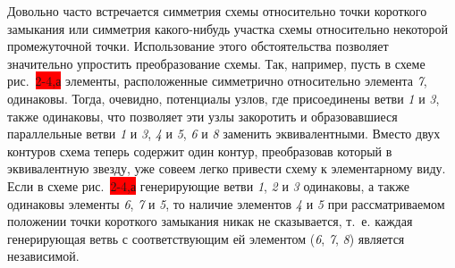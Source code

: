 Довольно часто встречается симметрия схемы относительно точки короткого замыкания или симметрия какого-нибудь участка схемы относительно некоторой промежуточной точки. Использование этого обстоятельства позволяет значительно упростить преобразование схемы. Так, например, пусть в схеме рис.~\colorbox{red}{2-4,а} элементы, расположенные симметрично относительно элемента \textit{7}, одинаковы. Тогда, очевидно, потенциалы узлов, где присоединены ветви \textit{1} и \textit{3}, также одинаковы, что позволяет эти узлы закоротить и образовавшиеся параллельные ветви \textit{1} и \textit{3}, \textit{4} и \textit{5}, \textit{6} и \textit{8} заменить эквивалентными. Вместо двух контуров схема теперь содержит один контур, преобразовав который в эквивалентную звезду, уже совеем легко привести схему к элементарному виду. Если в схеме рис.~\colorbox{red}{2-4,а} генерирующие ветви \textit{1}, \textit{2} и \textit{3} одинаковы, а также одинаковы элементы \textit{6}, \textit{7} и \textit{5}, то наличие элементов \textit{4} и \textit{5} при рассматриваемом положении точки короткого замыкания никак не сказывается, т.~е. каждая генерирующая ветвь с соответствующим ей элементом (\textit{6}, \textit{7}, \textit{8}) является независимой.

